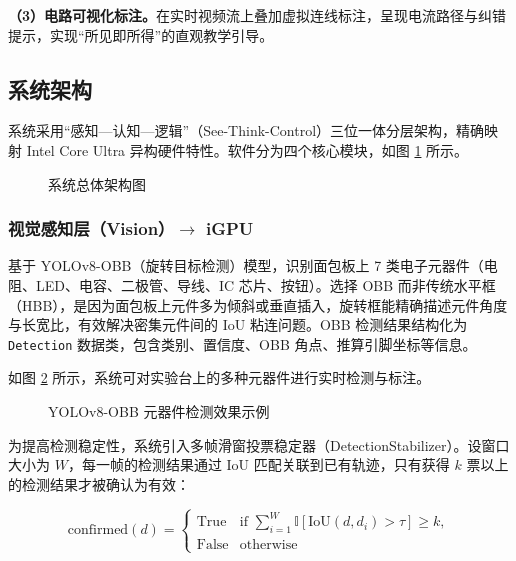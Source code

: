 \documentclass[a4paper,12pt,fontset=ubuntu]{ctexart}
\begin{document}
\textbf{（3）电路可视化标注。}在实时视频流上叠加虚拟连线标注，呈现电流路径与纠错提示，实现“所见即所得”的直观教学引导。

\subsection{系统架构}

系统采用“感知—认知—逻辑”（See-Think-Control）三位一体分层架构，精确映射 Intel Core Ultra 异构硬件特性。软件分为四个核心模块，如图 \ref{fig:arch} 所示。

\begin{figure}[htbp]
    \centering
    \caption{系统总体架构图}
    \label{fig:arch}
\end{figure}

\subsubsection{视觉感知层（Vision）$\rightarrow$ iGPU}

基于 YOLOv8-OBB（旋转目标检测）模型，识别面包板上 7 类电子元器件（电阻、LED、电容、二极管、导线、IC 芯片、按钮）。选择 OBB 而非传统水平框（HBB），是因为面包板上元件多为倾斜或垂直插入，旋转框能精确描述元件角度与长宽比，有效解决密集元件间的 IoU 粘连问题。OBB 检测结果结构化为 \texttt{Detection} 数据类，包含类别、置信度、OBB 角点、推算引脚坐标等信息。

如图 \ref{fig:yolo-demo} 所示，系统可对实验台上的多种元器件进行实时检测与标注。

\begin{figure}[htbp]
    \centering
    \caption{YOLOv8-OBB 元器件检测效果示例}
    \label{fig:yolo-demo}
\end{figure}

为提高检测稳定性，系统引入多帧滑窗投票稳定器（DetectionStabilizer）。设窗口大小为 $W$，每一帧的检测结果通过 IoU 匹配关联到已有轨迹，只有获得 $k$ 票以上的检测结果才被确认为有效：

\begin{equation}
\text{confirmed}(d) = \begin{cases}
  \text{True} & \text{if } \sum_{i=1}^W \mathbb{I}[\text{IoU}(d, d_i) > \tau] \ge k, \\
  \text{False} & \text{otherwise}
\end{cases}
\label{eq:stabilizer}
\end{equation}
\end{document}
